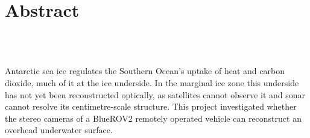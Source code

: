 \chapter{Abstract}				
\label{ch:abs}

%
\begin{center}
	\textbf{\Large \titl}\\
			\vskip 0.2cm
			\auth\\
			\vskip 0.2cm
	\textit{\footnotesize \FullDate}
			\vskip 1cm
\end{center}
Antarctic sea ice regulates the Southern Ocean's uptake of heat and carbon dioxide, much of it at the ice underside.
In the marginal ice zone this underside has not yet been reconstructed optically, as satellites cannot observe it
and sonar cannot resolve its centimetre-scale structure. This project investigated whether the stereo cameras of a
BlueROV2 remotely operated vehicle can reconstruct an overhead underwater surface.

